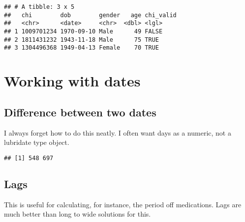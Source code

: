 \documentclass[]{book}
\newenvironment{Shaded}{\begin{snugshade}}{\end{snugshade}}
\newcommand{\KeywordTok}[1]{\textcolor[rgb]{0.13,0.29,0.53}{\textbf{#1}}}
\newcommand{\NormalTok}[1]{#1}
\newcommand{\OperatorTok}[1]{\textcolor[rgb]{0.81,0.36,0.00}{\textbf{#1}}}
\newcommand{\StringTok}[1]{\textcolor[rgb]{0.31,0.60,0.02}{#1}}
\theoremstyle{definition}
\theoremstyle{definition}
\theoremstyle{definition}
\theoremstyle{remark}
\begin{document}
\begin{verbatim}
## # A tibble: 3 x 5
##   chi        dob        gender   age chi_valid
##   <chr>      <date>     <chr>  <dbl> <lgl>    
## 1 1009701234 1970-09-10 Male      49 FALSE    
## 2 1811431232 1943-11-18 Male      75 TRUE     
## 3 1304496368 1949-04-13 Female    70 TRUE
\end{verbatim}

\hypertarget{working-with-dates}{%
\section{Working with dates}\label{working-with-dates}}

\hypertarget{difference-between-two-dates}{%
\subsection{Difference between two
dates}\label{difference-between-two-dates}}

I always forget how to do this neatly. I often want days as a numeric,
not a lubridate type object.

\begin{Shaded}
\end{Shaded}

\begin{verbatim}
## [1] 548 697
\end{verbatim}

\hypertarget{lags}{%
\subsection{Lags}\label{lags}}

This is useful for calculating, for instance, the period off
medications. Lags are much better than long to wide solutions for this.
\end{document}
